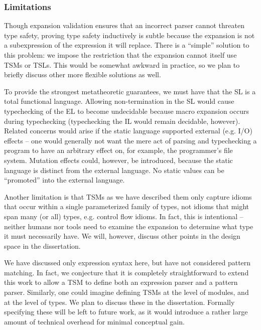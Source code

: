 \subsubsection{Limitations}\label{sec:tsms-limitations}
Though expansion validation ensures that an incorrect parser cannot threaten type safety,  proving type safety inductively is subtle because the expansion is not a subexpression of the expression it will replace. There is a ``simple'' solution to this problem: we impose the restriction that the expansion cannot itself use TSMs or TSLs. This would be somewhat awkward in practice, so we plan to briefly discuss other more flexible solutions as well.  

To provide the strongest metatheoretic guarantees, we must have that the SL is a total functional language. Allowing non-termination in the SL would cause typechecking of the EL to become undecidable because macro expansion occurs during typechecking (typechecking the IL would remain decidable, however). Related concerns would arise if the static language supported external (e.g. I/O) effects -- one would generally not want the mere act of parsing and typechecking a program to have an arbitrary effect on, for example, the programmer's file system. Mutation effects could, however, be introduced, because the static language is distinct from the external language. No static values can be ``promoted'' into the external language. 

Another limitation is that TSMs as we have described them only capture idioms that occur within a single parameterized family of types,  not idioms that might span many (or all) types, e.g. control flow idioms. In fact, this is intentional -- neither humans nor tools need to examine the expansion to determine what type it must necessarily have. We will, however, discuss other points in the design space in the dissertation.

We have discussed only expression syntax here, but have not considered pattern matching. In fact, we conjecture that it is completely straightforward to extend this work to allow a TSM to define both an expression parser and a pattern parser. Similarly, one could imagine defining TSMs at the level of modules, and at the level of types. We plan to discuss these in the dissertation. Formally specifying these will be left to future work, as it would introduce a rather large amount of technical overhead for minimal conceptual gain. %


